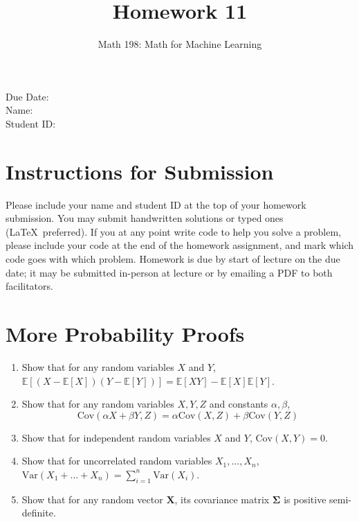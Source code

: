 \documentclass{article}
\title{Homework 11}
\author{Math 198: Math for Machine Learning}
\date{}
\begin{document}
\maketitle

\noindent
Due Date:  \\
Name: \\
Student ID:

\section*{Instructions for Submission}
Please include your name and student ID at the top of your homework submission. You may submit handwritten solutions or typed ones (\LaTeX\ preferred). If you at any point write code to help you solve a problem, please include your code at the end of the homework assignment, and mark which code goes with which problem. Homework is due by start of lecture on the due date; it may be submitted in-person at lecture or by emailing a PDF to both facilitators.

\section{More Probability Proofs}
\begin{enumerate}[label=\arabic*.]
\item Show that for any random variables $X$ and $Y$, $\mathbb{E}[(X - \mathbb{E}[X])(Y - \mathbb{E}[Y])] = \mathbb{E}[XY] - \mathbb{E}[X]\mathbb{E}[Y]$.
\item Show that for any random variables $X, Y, Z$ and constants $\alpha, \beta$, $$\text{Cov}(\alpha X + \beta Y, Z) = \alpha\text{Cov}(X, Z) + \beta\text{Cov}(Y, Z)$$
\item Show that for independent random variables $X$ and $Y$, $\text{Cov}(X, Y) = 0$.
\item Show that for uncorrelated random variables $X_1, \hdots, X_n$, $\text{Var}(X_1 + \hdots + X_n) = \sum_{i = 1}^n \text{Var}(X_i)$.
\item Show that for any random vector $\mathbf{X}$, its covariance matrix $\mathbf{\Sigma}$ is positive semi-definite.
\end{enumerate}
\end{document}
